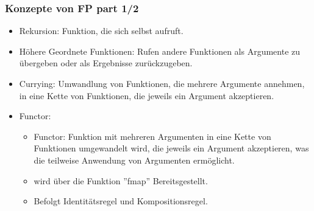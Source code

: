 \documentclass{beamer}
\begin{document}
\begin{frame}
\frametitle{Konzepte  von FP part 1/2} 
	\begin{itemize}
		\item Rekursion:   Funktion, die sich selbst aufruft.
		\item Höhere Geordnete Funktionen: Rufen andere Funktionen als Argumente zu übergeben oder als Ergebnisse zurückzugeben.
			\item Currying: Umwandlung von Funktionen, die mehrere Argumente annehmen, in eine Kette von Funktionen, die jeweils ein Argument akzeptieren.
			\item Functor: \begin{itemize}
			    \item Functor: Funktion mit mehreren Argumenten in eine Kette von Funktionen umgewandelt wird, die jeweils ein Argument akzeptieren, was die teilweise Anwendung von Argumenten ermöglicht. 
			    \item wird über die Funktion ''fmap'' Bereitsgestellt.
                    \item  Befolgt Identitätsregel und Kompositionsregel.
			\end{itemize}
	\end{itemize}
\end{frame}
\end{document}
